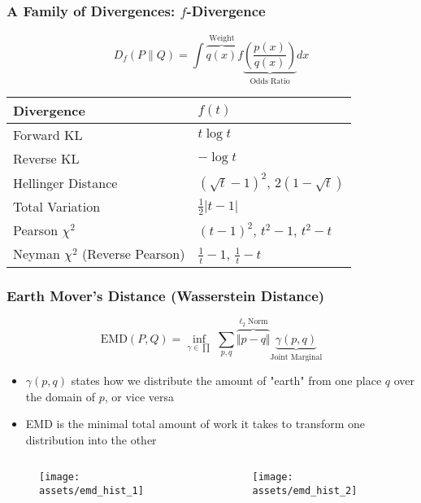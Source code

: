\documentclass{beamer}
\begin{document}
\begin{frame}
  \frametitle{A Family of Divergences: $f$-Divergence}
  \begin{equation*}
    D_{f}(P \parallel Q) = \int \overbrace{q(x)}^{\text{Weight}} f \underbrace{\left( \frac{p(x)}{q(x)} \right)}_{\text{Odds Ratio}} dx
  \end{equation*}
  \begin{center}
  \begin{tabular}{C{5cm}|C{5cm}}
  \toprule
  {Divergence} & $f(t)$ \\
  \midrule
  Forward KL   &  $t \log t$ \\
  Reverse KL   &  $- \log t$ \\
  Hellinger Distance  &  $\left(\sqrt{t} - 1 \right)^2$, $2 \left( 1 - \sqrt{t} \right)$ \\
  Total Variation & $\frac{1}{2} \vert t - 1 \vert$ \\
  Pearson $\chi^2$ & $\left( t-1 \right)^2$, $t^2 - 1$, $t^2 - t$ \\
  Neyman $\chi^2$ (Reverse Pearson) & $\frac{1}{t} - 1$, $\frac{1}{t} - t$ \\
  \bottomrule
  \end{tabular}
  \end{center}
\end{frame}


\begin{frame}
  \frametitle{Earth Mover's Distance (Wasserstein Distance)}
  \begin{equation*}
    \text{EMD}\left(P, Q\right) = \inf_{\gamma \in \prod}  \, \sum\limits_{p,q} \overbrace{\Vert p - q \Vert}^{\ell_2 \; \text{Norm}} \underbrace{\gamma \left( p, q \right)}_{\text{Joint Marginal}}
  \end{equation*}
  \begin{itemize}
    \item $\gamma \left( p, q \right)$ states how we distribute the amount of "earth" from one place $q$ over the domain of $p$, or vice versa
    \item EMD is the minimal total amount of work it takes to transform one distribution into the other
  \end{itemize}
  \begin{columns}
    \begin{column}{0.48\textwidth}
      \begin{figure}
        \centering
        \texttt{[image: assets/emd\_hist\_1]}
      \end{figure}
    \end{column}
    \begin{column}{0.48\textwidth}
      \begin{figure}
        \centering
        \texttt{[image: assets/emd\_hist\_2]}
      \end{figure}
    \end{column}
  \end{columns}
\end{frame}
\end{document}
